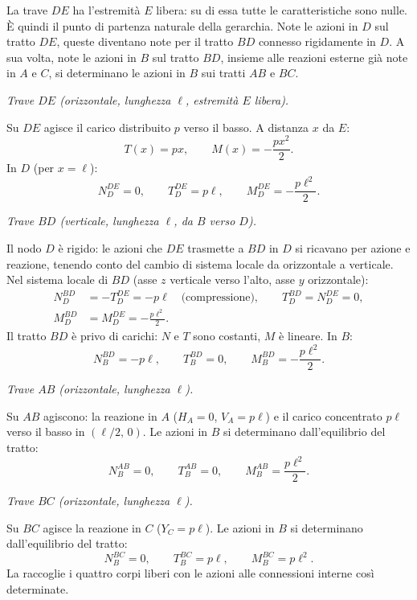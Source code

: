La trave $DE$ ha l'estremità $E$ libera: su
di essa tutte le caratteristiche sono nulle.
È quindi il punto di partenza naturale della
gerarchia. Note le azioni in $D$ sul tratto
$DE$, queste diventano note per il tratto $BD$
connesso rigidamente in $D$. A sua volta,
note le azioni in $B$ sul tratto $BD$, insieme
alle reazioni esterne già note in $A$ e $C$,
si determinano le azioni in $B$ sui tratti
$AB$ e $BC$.



\medskip
\noindent\textit{Trave $DE$ (orizzontale,
	lunghezza $\ell$, estremità $E$ libera).}

Su $DE$ agisce il carico distribuito $p$
verso il basso. A distanza $x$ da $E$:
\[
T(x) = px, \qquad M(x) = -\frac{px^2}{2}.
\]
In $D$ (per $x = \ell$):
\[
N_D^{DE} = 0, \qquad
T_D^{DE} = p\ell, \qquad
M_D^{DE} = -\frac{p\ell^2}{2}.
\]

\medskip
\noindent\textit{Trave $BD$ (verticale,
	lunghezza $\ell$, da $B$ verso $D$).}

Il nodo $D$ è rigido: le azioni che $DE$
trasmette a $BD$ in $D$ si ricavano per
azione e reazione, tenendo conto del cambio
di sistema locale da orizzontale a verticale.
Nel sistema locale di $BD$ (asse $z$ verticale
verso l'alto, asse $y$ orizzontale):
\[
\begin{aligned}
	N_D^{BD} &= -T_D^{DE} = -p\ell
	\quad\text{(compressione)},
	\qquad
	T_D^{BD} = N_D^{DE} = 0,\\[4pt]
	M_D^{BD} &= M_D^{DE} = -\frac{p\ell^2}{2}.
\end{aligned}
\]
Il tratto $BD$ è privo di carichi: $N$ e $T$
sono costanti, $M$ è lineare. In $B$:
\[
N_B^{BD} = -p\ell, \qquad
T_B^{BD} = 0, \qquad
M_B^{BD} = -\frac{p\ell^2}{2}.
\]

\medskip
\noindent\textit{Trave $AB$ (orizzontale,
	lunghezza $\ell$).}

Su $AB$ agiscono: la reazione in $A$
($H_A = 0$, $V_A = p\ell$) e il carico
concentrato $p\ell$ verso il basso in
$(\ell/2,\,0)$. Le azioni in $B$ si
determinano dall'equilibrio del tratto:
\[
N_B^{AB} = 0, \qquad
T_B^{AB} = 0, \qquad
M_B^{AB} = \frac{p\ell^2}{2}.
\]

\medskip
\noindent\textit{Trave $BC$ (orizzontale,
	lunghezza $\ell$).}

Su $BC$ agisce la reazione in $C$
($Y_C = p\ell$). Le azioni in $B$ si
determinano dall'equilibrio del tratto:
\[
N_B^{BC} = 0, \qquad
T_B^{BC} = p\ell, \qquad
M_B^{BC} = p\ell^2.
\]
La  raccoglie
i quattro corpi liberi con le azioni alle
connessioni interne così determinate.

